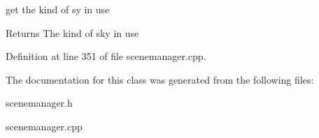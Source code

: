 get the kind of sy in use 

\begin{DoxyReturn}{Returns}
The kind of sky in use 
\end{DoxyReturn}


Definition at line 351 of file scenemanager.cpp.



The documentation for this class was generated from the following files:\begin{DoxyCompactItemize}
\item 
scenemanager.h\item 
scenemanager.cpp\end{DoxyCompactItemize}
